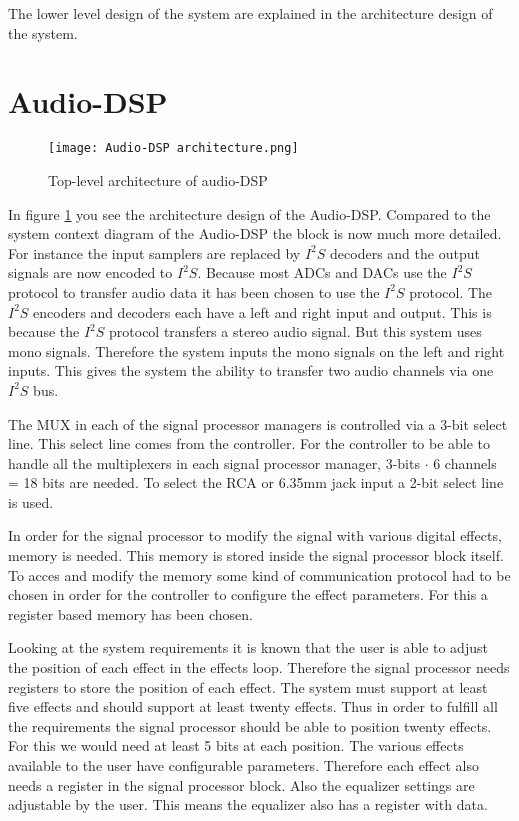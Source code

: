 The lower level design of the system are explained in the architecture design of the system. 

\section{Audio-DSP}
\begin{figure}[h]
    \texttt{[image: Audio-DSP architecture.png]}\\    
    \caption{Top-level architecture of audio-DSP}
    \label{fig:arch-top}
\end{figure}

In figure \ref*{fig:arch-top} you see the architecture design of the Audio-DSP. 
Compared to the system context diagram of the Audio-DSP the block is now much more detailed.
For instance the input samplers are replaced by $I^2S$ decoders and the output signals are now encoded to $I^2S$.
Because most ADCs and DACs use the $I^2S$ protocol to transfer audio data it has been chosen to use the $I^2S$ protocol.
The $I^2S$ encoders and decoders each have a left and right input and output.
This is because the $I^2S$ protocol transfers a stereo audio signal.
But this system uses mono signals. Therefore the system inputs the mono signals on the left and right inputs.
This gives the system the ability to transfer two audio channels via one $I^2S$ bus.

The MUX in each of the signal processor managers is controlled via a 3-bit select line.
This select line comes from the controller. 
For the controller to be able to handle all the multiplexers in each signal processor manager, 3-bits $\cdot$ 6 channels = 18 bits are needed.
To select the RCA or 6.35mm jack input a 2-bit select line is used.

In order for the signal processor to modify the signal with various digital effects, memory is needed.
This memory is stored inside the signal processor block itself. 
To acces and modify the memory some kind of communication protocol had to be chosen in order for the controller to configure the effect parameters.
For this a register based memory has been chosen.

Looking at the system requirements it is known that the user is able to adjust the position of each effect in the effects loop.
Therefore the signal processor needs registers to store the position of each effect.
The system must support at least five effects and should support at least twenty effects.
Thus in order to fulfill all the requirements the signal processor should be able to position twenty effects.
For this we would need at least 5 bits at each position.
The various effects available to the user have configurable parameters.
Therefore each effect also needs a register in the signal processor block.
Also the equalizer settings are adjustable by the user.
This means the equalizer also has a register with data.

